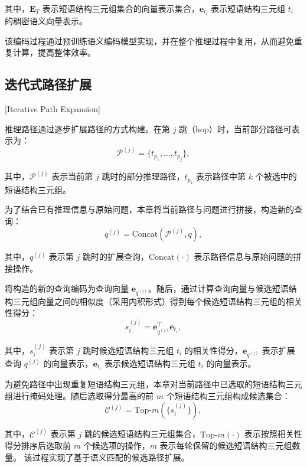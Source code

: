\noindent 其中，$\mathbf{E}_T$ 表示短语结构三元组集合的向量表示集合，$\mathbf{e}_{t_i}$ 表示短语结构三元组 $t_i$ 的稠密语义向量表示。

该编码过程通过预训练语义编码模型实现，并在整个推理过程中复用，从而避免重复计算，提高整体效率。

\subsection{迭代式路径扩展}[Iterative Path Expansion]

推理路径通过逐步扩展路径的方式构建。在第 $j$ 跳（hop）时，当前部分路径可表示为：
\begin{equation}
\mathcal{P}^{(j)} = \{ t_{p_1}, \dots, t_{p_j} \},
\end{equation}

\noindent 其中，$\mathcal{P}^{(j)}$ 表示当前第 $j$ 跳时的部分推理路径，$t_{p_k}$ 表示路径中第 $k$ 个被选中的短语结构三元组。

为了结合已有推理信息与原始问题，本章将当前路径与问题进行拼接，构造新的查询：
\begin{equation}
q^{(j)} = \text{Concat}(\mathcal{P}^{(j)}, q),
\end{equation}

\noindent 其中，$q^{(j)}$ 表示第 $j$ 跳时的扩展查询，$\text{Concat}(\cdot)$ 表示路径信息与原始问题的拼接操作。

将构造的新的查询编码为查询向量 $\mathbf{e}_{q^{(j)}}$。随后，通过计算查询向量与候选短语结构三元组向量之间的相似度（采用内积形式）得到每个候选短语结构三元组的相关性得分：
\begin{equation}
s_i^{(j)} = \mathbf{e}_{q^{(j)}}^\top \mathbf{e}_{t_i},
\end{equation}

\noindent 其中，$s_i^{(j)}$ 表示第 $j$ 跳时候选短语结构三元组 $t_i$ 的相关性得分，$\mathbf{e}_{q^{(j)}}$ 表示扩展查询 $q^{(j)}$ 的向量表示，$\mathbf{e}_{t_i}$ 表示候选短语结构三元组 $t_i$ 的向量表示。

为避免路径中出现重复短语结构三元组，本章对当前路径中已选取的短语结构三元组进行掩码处理。随后选取得分最高的前 $m$ 个短语结构三元组构成候选集合：
\begin{equation}
\mathcal{C}^{(j)} = \text{Top-}m(\{s_i^{(j)}\}),
\end{equation}

\noindent 其中，$\mathcal{C}^{(j)}$ 表示第 $j$ 跳的候选短语结构三元组集合，$\text{Top-}m(\cdot)$ 表示按照相关性得分排序后选取前 $m$ 个候选项的操作，$m$ 表示每轮保留的候选短语结构三元组数量。
该过程实现了基于语义匹配的候选路径扩展。

